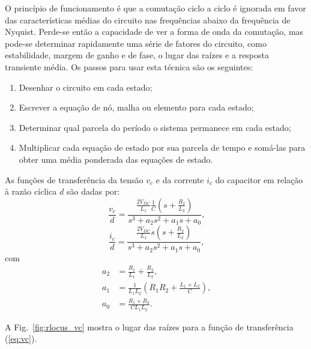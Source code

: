     O princípio de funcionamento é que a comutação ciclo a ciclo é ignorada em
    favor das características médias do circuito nas frequências abaixo da
    frequência de Nyquist. Perde-se então a capacidade de ver a forma de onda
    da comutação, mas pode-se determinar rapidamente uma série de fatores
    do circuito, como estabilidade, margem de ganho e de fase, o lugar das
    raízes e a resposta transiente média. Os passos para usar esta técnica são
    os seguintes:

    \begin{enumerate}
        \item Desenhar o circuito em cada estado;
        \item Escrever a equação de nó, malha ou elemento para cada estado;
        \item Determinar qual parcela do período o sistema permanece em cada estado;
        \item Multiplicar cada equação de estado por sua parcela de tempo e somá-las
            para obter uma média ponderada das equações de estado.
    \end{enumerate}

    As funções de transferência da tensão $v_c$ e da corrente $i_c$ do
    capacitor em relação à razão cíclica $d$ são dadas por:
    \begin{equation}
        \frac{v_c}{d} = \frac{\frac{2V_{DC}}{L_1} \frac{1}{C}
        	\left( s + \frac{R_2}{L_2} \right)}{s^3 + a_2 s^2 + a_1 s + a_0} \text{,}
        \label{eq:vc}
    \end{equation}
    \begin{equation}
        \frac{i_c}{d} = \frac{\frac{2V_{DC}}{L_1} s
        	\left( s + \frac{R_2}{L_2} \right)}{s^3 + a_2 s^2 + a_1 s + a_0} \text{,}
        \label{eq:ic}
    \end{equation}
    com
    \begin{equation}
    	\begin{split}
	        a_2 & = \frac{R_1}{L_1} + \frac{R_2}{L_2} \text{,} \\
	        a_1 & = \frac{1}{L_1 L_2} \left( R_1 R_2
	        	+ \frac{L_1 + L_2}{C} \right) \text{,} \\
	        a_0 & = \frac{R_1 + R_2}{C L_1 L_2} \text{.}
	    \end{split}
    \end{equation}

    A Fig.~\ref{fig:rlocus_vc} mostra o lugar das raízes para a função de
    transferência (\ref{eq:vc}).

